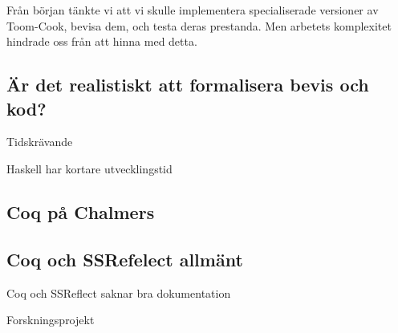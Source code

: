 Från början tänkte vi att vi skulle implementera specialiserade versioner av
Toom-Cook, bevisa dem, och testa deras prestanda. Men arbetets komplexitet
hindrade oss från att hinna med detta.

\subsection{Är det realistiskt att formalisera bevis och kod?}
Tidskrävande

Haskell har kortare utvecklingstid

\subsection{Coq på Chalmers}

\subsection{Coq och SSRefelect allmänt}
Coq och SSReflect saknar bra dokumentation

Forskningsprojekt
